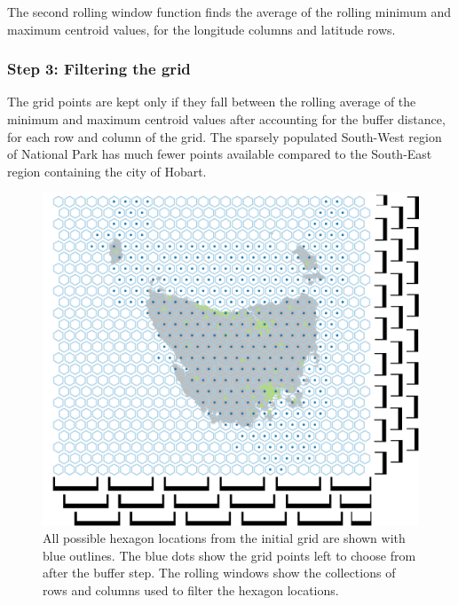 \documentclass[
]{jss}
\begin{document}
The second rolling window function finds the average of the rolling
minimum and maximum centroid values, for the longitude columns and
latitude rows.

\hypertarget{step-3-filtering-the-grid}{%
\subsubsection{Step 3: Filtering the
grid}\label{step-3-filtering-the-grid}}

The grid points are kept only if they fall between the rolling average
of the minimum and maximum centroid values after accounting for the
buffer distance, for each row and column of the grid. The sparsely
populated South-West region of National Park has much fewer points
available compared to the South-East region containing the city of
Hobart.

\begin{CodeChunk}
\begin{figure}

{\centering \includegraphics[width=1\linewidth]{figures/3grid} 

}

\caption[All possible hexagon locations from the initial grid are shown with blue outlines]{All possible hexagon locations from the initial grid are shown with blue outlines. The blue dots show the grid points left to choose from after the buffer step. The rolling windows show the collections of rows and columns used to filter the hexagon locations.}\label{fig:filter_grid}
\end{figure}
\end{CodeChunk}
\end{document}
